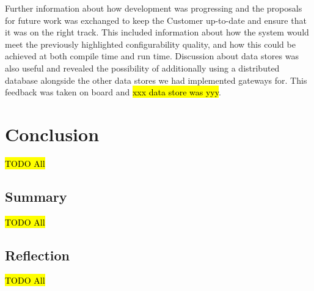 \documentclass[10pt,a4paper]{article}
\begin{document}
Further information about how development was progressing and the proposals for future work was exchanged to keep the Customer up-to-date and ensure that it was on the right track. This included information about how the system would meet the previously highlighted configurability quality, and how this could be achieved at both compile time and run time. Discussion about data stores was also useful and revealed the possibility of additionally using a distributed database alongside the other data stores we had implemented gateways for. This feedback was taken on board and \hl{xxx data store was yyy}.


\section{Conclusion}
\label{sec:conclusion}
\hl{TODO All}

\subsection{Summary}
\label{sec:summary}
\hl{TODO All}

\subsection{Reflection}
\label{sec:reflection}
\hl{TODO All}



\end{document}
